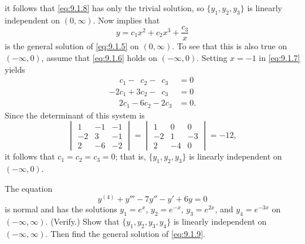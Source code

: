\begin{solution}
\[\]
it follows that \eqref{eq:9.1.8} has only the trivial solution, so
$\{y_1,y_2,y_3\}$ is linearly independent on $(0,\infty)$. Now
 implies that
\[
y=c_1x^2+c_2x^3+\frac{c_3}{x}
\]
is the general solution of \eqref{eq:9.1.5} on $(0,\infty)$.
To see that this is also true
 on $(-\infty,0)$,  assume that \eqref{eq:9.1.6} holds on
$(-\infty,0)$. Setting $x=-1$ in \eqref{eq:9.1.7} yields
\begin{align*}
\phantom{-2}c_1-\phantom{3}c_2-\phantom{2}c_3&=0\\
-2c_1+3c_2-\phantom{2}c_3&=0\\
\phantom{-}2c_1-6c_2-2c_3&=0.
\end{align*}
Since the determinant of this system is
\[
\begin{vmatrix}1&-1&-1\\-2&3&-1\\2&-6&-2\end{vmatrix}=
\begin{vmatrix}1&0&0\\-2&1&-3\\2&-4&0\end{vmatrix}=-12,
\]
it follows that $c_1=c_2=c_3=0$; that is, $\{y_1,y_2,y_3\}$
is linearly independent on $(-\infty,0)$.
\end{solution}

\begin{example}\label{example:9.1.2}
The equation
\begin{equation}\label{eq:9.1.9}
y^{(4)}+y'''-7y''-y'+6y=0
\end{equation}
is normal and has the solutions $y_1=e^x$, $y_2=e^{-x}$, $y_3=e^{2x}$,
and $y_4=e^{-3x}$ on $(-\infty,\infty)$. (Verify.) Show that
$\{y_1,y_2,y_3,y_4\}$ is linearly independent on $(-\infty,\infty)$.
Then find the general solution of \eqref{eq:9.1.9}.
\end{example}

